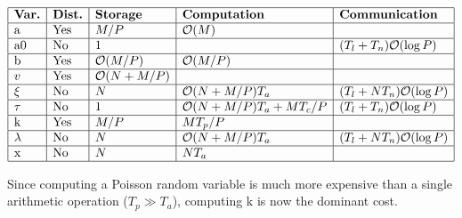 \documentclass[letterpaper]{article}
\begin{document}
\begin{table}[h]
\[
\begin{array}{|l|l|l|l|l|}
\hline %
\text{\bf{Var.}} & 
\text{\bf{Dist.}} & 
\text{\bf{Storage}} & 
\text{\bf{Computation}} & 
\text{\bf{Communication}} \\
\hline %
\text{a} &
\text{Yes} &
M / P &
\mathcal{O}(M) &
\\
\hline %
\text{a0} & 
\text{No} &
1 &
&
(T_l + T_n) \mathcal{O}(\log P) \\
\hline %
\text{b} &
\text{Yes} &
\mathcal{O}(M / P) &
\mathcal{O}(M / P) &
\\
\hline %
v &
\text{Yes} &
\mathcal{O}(N + M / P) &
&
\\
\hline %
\xi &
\text{No} &
N &
\mathcal{O}(N + M / P) T_a &
(T_l + N T_n) \mathcal{O}(\log P) \\
\hline %
\tau & 
\text{No} &
1 &
\mathcal{O}(N + M / P) T_a + M T_c / P &
(T_l + T_n) \mathcal{O}(\log P) \\
\hline %
\text{k} & 
\text{Yes} &
M / P &
M T_p / P&
\\
\hline %
\lambda & 
\text{No} &
N &
\mathcal{O}(N + M / P) T_a &
(T_l + N T_n) \mathcal{O}(\log P) \\
\hline %
\text{x} & 
\text{No} &
N &
N T_a&
\\
\hline %
\end{array}
\]
\caption{Computational and communication complexity for one step in the 
         concurrent algorithm for the basic $\tau$-leap method using 
         sparse arrays.}
\label{concurrentComplexitySparse}
\end{table}


Since computing a Poisson random variable is much more expensive than 
a single arithmetic operation ($T_p \gg T_a$), computing k is now the 
dominant cost.
\end{document}
